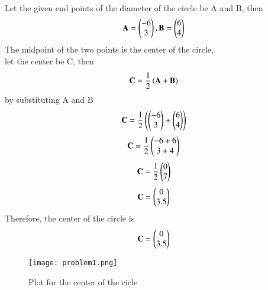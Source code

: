 \documentclass[journal]{IEEEtran}
\begin{document}
         \solution \\
         Let the given end points of the diameter of the circle be A and B, then\\
         \begin{align}
             \mathbf{A} = \begin{pmatrix}-6 \\ 3\end{pmatrix}, \mathbf{B} = \begin{pmatrix}6 \\ 4\end{pmatrix}
         \end{align}
         The midpoint of the two points is the center of the circle,\\
         let the center be C, then
         \begin{align}
             \mathbf{C}=\frac{1}{2} \left(\mathbf{A}+\mathbf{B}\right)
         \end{align}
         by substituting A and B
         \begin{align}
             \mathbf{C}=\frac{1}{2}\left(\begin{pmatrix}-6 \\ 3\end{pmatrix} + \begin{pmatrix}6 \\ 4\end{pmatrix}\right)
         \end{align}
         \begin{align}
             \mathbf{C}=\frac{1}{2}\begin{pmatrix}-6+6 \\ 3+4\end{pmatrix}
         \end{align}
         \begin{align}
             \mathbf{C}=\frac{1}{2}\begin{pmatrix}0 \\ 7\end{pmatrix}
         \end{align}
         \begin{align}
             \mathbf{C}=\begin{pmatrix}0 \\ 3.5\end{pmatrix}
         \end{align}
         Therefore, the center of the circle is \\
         \begin{align*}
             \mathbf{C}=\begin{pmatrix}0 \\ 3.5\end{pmatrix}
         \end{align*}
         \begin{figure}
             \centering
             \texttt{[image: problem1.png]}
             \caption{Plot for the center of the cicle }
             \label{1.5.37}
         \end{figure}
         
\end{document}
